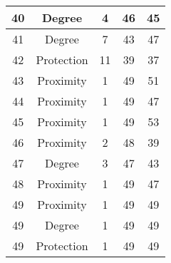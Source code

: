 \documentclass[results.tex]{subfiles}
\begin{document}
\begin{center}
\begin{tabular}{| c || c | c | c | c |}
    \hline
    40 & Degree & 4 & 46 & 45 \\ 
    \hline
    41 & Degree & 7 & 43 & 47 \\ 
    \hline
    42 & Protection & 11 & 39 & 37 \\ 
    \hline
    43 & Proximity & 1 & 49 & 51 \\ 
    \hline
    44 & Proximity & 1 & 49 & 47 \\ 
    \hline
    45 & Proximity & 1 & 49 & 53 \\ 
    \hline
    46 & Proximity & 2 & 48 & 39 \\ 
    \hline
    47 & Degree & 3 & 47 & 43 \\ 
    \hline
    48 & Proximity & 1 & 49 & 47 \\ 
    \hline
    49 & Proximity & 1 & 49 & 49 \\ 
    \hline
    49 & Degree & 1 & 49 & 49 \\ 
    \hline
    49 & Protection & 1 & 49 & 49 \\ 
    \hline   \end{tabular}
\end{center}
\end{document}
